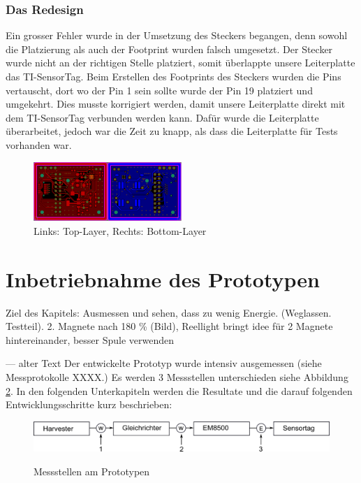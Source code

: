 \subsubsection{Das Redesign}

Ein grosser Fehler wurde in der Umsetzung des Steckers begangen, denn sowohl die Platzierung als auch der Footprint wurden falsch umgesetzt. Der Stecker wurde nicht an der richtigen Stelle platziert, somit überlappte unsere Leiterplatte das TI-SensorTag. Beim Erstellen des Footprints des Steckers wurden die Pins vertauscht, dort wo der Pin 1 sein sollte wurde der Pin 19 platziert und umgekehrt. Dies musste korrigiert werden, damit unsere Leiterplatte direkt mit dem TI-SensorTag verbunden werden kann. Dafür wurde die Leiterplatte überarbeitet, jedoch war die Zeit zu knapp, als dass die Leiterplatte für Tests vorhanden war.

\begin{figure}[ht]
    \includegraphics[width=0.5\textwidth]{3Vorgehen/imag/Layout_Redesign.png}
    \caption{Links: Top-Layer, Rechts: Bottom-Layer}\label{layout_redesign} 
\end{figure}


\section{Inbetriebnahme des Prototypen}
Ziel des Kapitels: Ausmessen und sehen, dass zu wenig Energie. (Weglassen. Testteil). 2. Magnete nach 180 \% (Bild), Reellight bringt idee für 2 Magnete hintereinander, besser Spule verwenden

--- alter Text
Der entwickelte Prototyp wurde intensiv ausgemessen (siehe Messprotokolle XXXX.)  Es werden 3 Messstellen unterschieden siehe Abbildung \ref{EnergieMessungStellen}. In den folgenden Unterkapiteln werden die Resultate und die darauf folgenden Entwicklungsschritte kurz beschrieben:

\begin{figure}[ht]
  \includegraphics[width=1.0\textwidth]{3Vorgehen/imag/EnergiemessungStellen.png}\label{EnergieMessungStellen} 
  \caption{Messstellen am Prototypen}
\end{figure}

